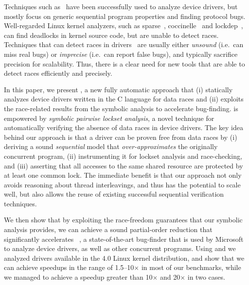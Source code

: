 Techniques such as~\cite{ball2006thorough, clarke2004predicate, engler2000checking, henzinger2002temporal, cook2006termination, kuznetsov2010testing, renzelmann2012symdrive, lal2012corral} have been successfully used to analyze device drivers, but mostly focus on generic sequential program properties and finding protocol bugs. Well-regarded Linux kernel analyzers, such as sparse~\cite{corbet2004sparse}, coccinelle~\cite{padioleau2008doc} and lockdep~\cite{corbet2006lock}, can find deadlocks in kernel source code, but are unable to detect races. Techniques that can detect races in drivers~\cite{qadeer2004kiss, pratikakis2006locksmith, voung2007relay, lal2012corral} are usually either \emph{unsound} (i.e.\ can miss real bugs) or \emph{imprecise} (i.e.\ can report false bugs), and typically sacrifice precision for scalability. Thus, there is a clear need for new tools that are able to detect races efficiently and precisely.

In this paper, we present \whoop, a new fully automatic approach that (i) statically analyzes device drivers written in the C language for data races and (ii) exploits the race-related results from the symbolic analysis to accelerate bug-finding. \whoop is empowered by \emph{symbolic pairwise lockset analysis}, a novel technique for automatically verifying the absence of data races in device drivers. The key idea behind our approach is that a driver can be proven free from data races by (i) deriving a sound \emph{sequential} model that \emph{over-approximates} the originally concurrent program, (ii) instrumenting it for lockset analysis and race-checking, and (iii) asserting that all accesses to the same shared resource are protected by at least one common lock. The immediate benefit is that our approach not only avoids reasoning about thread interleavings, and thus has the potential to scale well, but also allows the reuse of existing successful sequential verification techniques.

We then show that by exploiting the race-freedom guarantees that our symbolic analysis provides, we can achieve a sound partial-order reduction that significantly accelerates \corral~\cite{lal2012corral}, a state-of-the-art bug-finder that is used by Microsoft to analyze device drivers, as well as other concurrent programs. Using \whoop and \corral we analyzed \sizeOfBenchmarks drivers available in the 4.0 Linux kernel distribution, and show that we can achieve speedups in the range of 1.5--10$\times$ in most of our benchmarks, while we managed to achieve a speedup greater than 10$\times$ and 20$\times$ in two cases.

